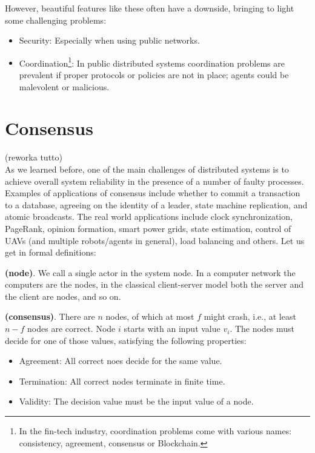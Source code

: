 \bigskip
\noindent
However, beautiful features like these often have a downside, bringing to light some challenging problems:
\begin{itemize}
    \item Security: Especially when using public networks.
    \item Coordination\footnote{In the fin-tech industry, coordination problems come with various names: consistency, agreement, consensus or Blockchain.}: In public distributed systems coordination problems are prevalent if proper protocols or policies are not in place; agents could be malevolent or malicious.
\end{itemize}

\bigskip
\section{Consensus}
(reworka tutto) \\
As we learned before, one of the main challenges of distributed systems is to achieve overall system reliability in the presence of a number of faulty processes. Examples of applications of consensus include whether to commit a transaction to a database, agreeing on the identity of a leader, state machine replication, and atomic broadcasts. The real world applications include clock synchronization, PageRank, opinion formation, smart power grids, state estimation, control of UAVs (and multiple robots/agents in general), load balancing and others. Let us get in formal definitions:
\begin{mydef} {\bf (node)}.
    We call a single actor in the system node. In a computer network the computers are the nodes, in the classical client-server model both the server and the client are nodes, and so on.
\end{mydef}
\begin{mydef} {\bf (consensus)}.\label{def:consensus}
    There are $n$ nodes, of which at most $f$ might crash, i.e., at least $n-f$ nodes are correct. Node $i$ starts with an input value $v_{i}$. The nodes must decide for one of those values, satisfying the following properties:
    \begin{itemize}
        \item Agreement: All correct noes decide for the same value.
        \item Termination: All correct nodes terminate in finite time.
        \item Validity: The decision value must be the input value of a node.
    \end{itemize}
\end{mydef}

